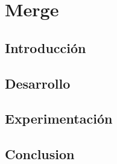 \documentclass[10pt, a4paper,english,spanish]{article}
\begin{document}
\section{Merge}
\subsection{Introducción}

\newpage
\subsection{Desarrollo}

\newpage
\subsection{Experimentación}

\newpage
\subsection{Conclusion}
\end{document}
